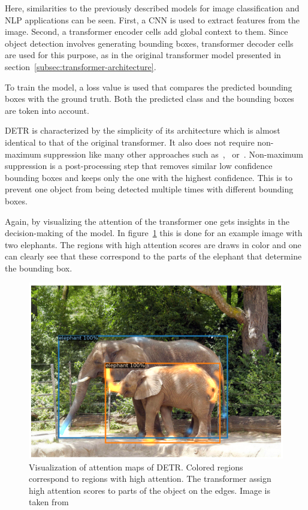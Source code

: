 \documentclass[a4paper]{scrartcl}
\begin{document}
    Here, similarities to the previously described models for image classification and NLP applications can be seen.
    First, a CNN is used to extract features from the image.
    Second, a transformer encoder cells add global context to them.
    Since object detection involves generating bounding boxes, transformer decoder cells are used for this purpose, as in the original transformer model presented in section~\ref{subsec:transformer-architecture}.

    To train the model, a loss value is used that compares the predicted bounding boxes with the ground truth.
    Both the predicted class and the bounding boxes are token into account.

    DETR is characterized by the simplicity of its architecture which is almost identical to that of the original transformer.
    It also does not require non-maximum suppression like many other approaches such as~\cite{dumitru2014scalable},~\cite{lin2018focal} or~\cite{wei2016single}.
    Non-maximum suppression is a post-processing step that removes similar low confidence bounding boxes and keeps only the one with the highest confidence.
    This is to prevent one object from being detected multiple times with different bounding boxes.

    Again, by visualizing the attention of the transformer one gets insights in the decision-making of the model.
    In figure~\ref{fig:detr-visualization} this is done for an example image with two elephants.
    The regions with high attention scores are draws in color and one can clearly see that these correspond to the parts of the elephant that determine the bounding box.

    \begin{figure}[btp]
        \centering
        \includegraphics[width=0.7\linewidth]{img/DetrVisualization}
        \caption[DETR Visualization]{Visualization of attention maps of DETR\@.
        Colored regions correspond to regions with high attention.
        The transformer assign high attention scores to parts of the object on the edges.
        Image is taken from~\cite{carion2020endtoend}}
        \label{fig:detr-visualization}
    \end{figure}
\end{document}
